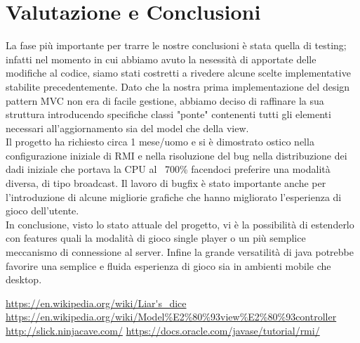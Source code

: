 \documentclass{llncs}
\begin{document}
	\section{Valutazione e Conclusioni}%
		La fase più importante per trarre le nostre conclusioni è stata quella di testing; infatti nel momento in cui abbiamo avuto la nesessità di apportate delle modifiche al codice, siamo stati costretti a rivedere alcune scelte implementative stabilite precedentemente. Dato che la nostra prima implementazione del design pattern MVC non era di facile gestione, abbiamo deciso di raffinare la sua struttura introducendo specifiche classi "ponte" contenenti tutti gli elementi necessari all'aggiornamento sia del model che della view. \\
		Il progetto ha richiesto circa 1 mese/uomo e si è dimostrato ostico nella configurazione iniziale di RMI e nella risoluzione del bug nella distribuzione dei dadi iniziale che portava la CPU al ~700\% facendoci preferire una modalità diversa, di tipo broadcast.
		Il lavoro di bugfix è stato importante anche per l'introduzione di alcune migliorie grafiche che hanno migliorato l'esperienza di gioco dell'utente. \\
		In conclusione, visto lo stato attuale del progetto, vi è la possibilità di estenderlo con features quali la modalità di gioco single player o un più semplice meccanismo di connessione al server. Infine la grande versatilità di java potrebbe favorire una semplice e fluida esperienza di gioco sia in ambienti mobile che desktop.
	

	\begin{thebibliography}{}
		 \url{https://en.wikipedia.org/wiki/Liar's\_dice}
		 \url{https://en.wikipedia.org/wiki/Model%E2%80%93view%E2%80%93controller}
		 \url{http://slick.ninjacave.com/}
		 \url{https://docs.oracle.com/javase/tutorial/rmi/}
	\end{thebibliography}
\end{document}
